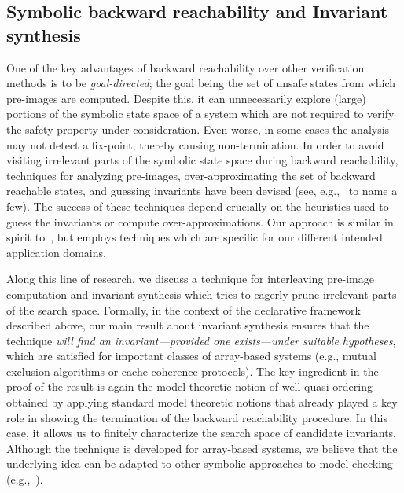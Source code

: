 \documentclass{LMCS}
\theoremstyle{plain}\newtheorem{assumption}[thm]{Assumption}
\theoremstyle{plain}\newtheorem{proposition}[thm]{Proposition}
\theoremstyle{plain}\newtheorem{property}[thm]{Property}
\theoremstyle{plain}\newtheorem{example}[thm]{Example}
\theoremstyle{plain}\newtheorem{claim}[thm]{Claim}
\theoremstyle{plain}\newtheorem{lemma}[thm]{Lemma}
\begin{document}
\subsection{Symbolic backward reachability and Invariant synthesis}

One of the key advantages of backward reachability over other
verification methods is to be \emph{goal-directed}; the goal being the
set of unsafe states from which pre-images are computed.
Despite this, it can unnecessarily explore (large) portions of the
symbolic state space of a system which are not required to verify the
safety property under consideration.  Even worse, in some cases the
analysis may not detect a fix-point, thereby causing non-termination.
In order to avoid visiting irrelevant parts of the symbolic state
space during backward reachability, techniques for analyzing
pre-images, over-approximating the set of backward reachable states,
and guessing invariants have been devised (see,
e.g.,~\cite{dill-cav95,henzinger-hytech,park-dill-pvs,bjorner-browne-manna-cp95,bradleymanna,pnueli,qaaderflanagan,rybalchenko,indexedabs}
to name a few).  The success of these techniques depend crucially on
the heuristics used to guess the invariants or compute
over-approximations.  Our approach is similar in spirit
to~\cite{bradleymanna}, but employs techniques which are specific for
our different intended application domains.

Along this line of research, we discuss a technique for interleaving
pre-image computation and invariant synthesis which tries to eagerly
prune irrelevant parts of the search space.  Formally, in the context
of the declarative framework described above, our main result about
invariant synthesis ensures that the technique \emph{will find an
  invariant---provided one exists---under suitable hypotheses}, which
are satisfied for important classes of array-based systems (e.g.,
mutual exclusion algorithms or cache coherence protocols).  The key
ingredient in the proof of the result is again the model-theoretic
notion of well-quasi-ordering obtained by applying standard model
theoretic notions that already played a key role in showing the
termination of the backward reachability procedure.  In this case, it
allows us to finitely characterize the search space of candidate
invariants.
Although the technique is developed for array-based systems, we
believe that the underlying idea can be adapted to other symbolic
approaches to model checking (e.g.,~\cite{tacas06,cav06}).
\end{document}
